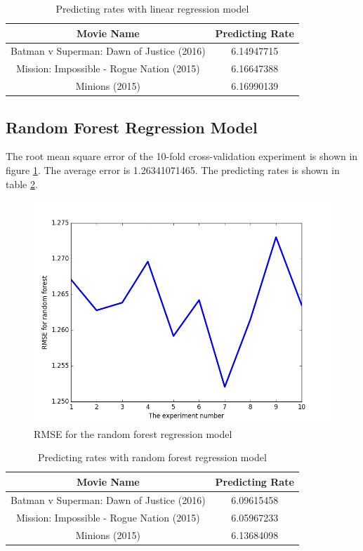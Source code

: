 \documentclass{article}
\begin{document}
\begin {table}[htbp]
\caption{Predicting rates with linear regression model}
\begin{adjustbox}{center}
\label{tb:8_1}
\begin{tabular}{|c|c|}
\hline
Movie Name&Predicting Rate\\
\hline
Batman v Superman: Dawn of Justice (2016)&6.14947715\\
\hline
Mission: Impossible - Rogue Nation (2015)&6.16647388\\
\hline
Minions (2015)&6.16990139\\
\hline
\end{tabular}
\end{adjustbox}
\end{table}

\subsection{Random Forest Regression Model}
The root mean square error of the 10-fold cross-validation experiment is shown in figure \ref{fig:8_2}. The average error is 1.26341071465. The predicting rates is shown in table \ref{tb:8_2}.\\

\begin{figure}[htbp]
\centering
\includegraphics[width=.6\textwidth]{rfr.png}
\caption{RMSE for the random forest regression model}
\label{fig:8_2}
\end{figure}

\begin {table}[htbp]
\caption{Predicting rates with random forest regression model}
\begin{adjustbox}{center}
\label{tb:8_2}
\begin{tabular}{|c|c|}
\hline
Movie Name&Predicting Rate\\
\hline
Batman v Superman: Dawn of Justice (2016)&6.09615458\\
\hline
Mission: Impossible - Rogue Nation (2015)&6.05967233\\
\hline
Minions (2015)&6.13684098\\
\hline
\end{tabular}
\end{adjustbox}
\end{table}
\end{document}
